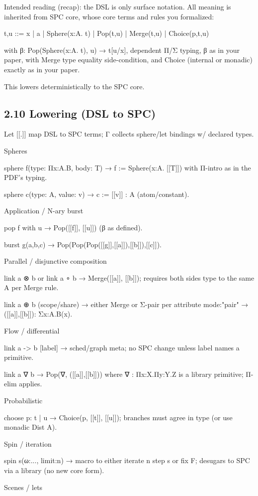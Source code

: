 \documentclass[12pt,a4paper]{article}
\theoremstyle{definition}
\theoremstyle{plain}
\begin{document}
Intended reading (recap): the DSL is only surface notation. All meaning is inherited from SPC core, whose core terms and rules you formalized:

t,u ::= x | a | Sphere(x:A. t) | Pop(t,u) | Merge(t,u) | Choice(p,t,u)

with β: Pop(Sphere(x:A. t), u) → t[u/x], dependent Π/Σ typing, β as in your paper, with Merge type equality side-condition, and Choice (internal or monadic) exactly as in your paper.

This lowers deterministically to the SPC core.

\subsection*{2.10 Lowering (DSL to SPC)}
Let [[.]] map DSL to SPC terms; Γ collects sphere/let bindings w/ declared types.

Spheres

sphere f(type: Πx:A.B, body: T) → f := Sphere(x:A. [[T]]) with Π-intro as in the PDF's typing. 

sphere c(type: A, value: v) → c := [[v]] : A (atom/constant). 


Application / N-ary burst

pop f with u → Pop([[f]], [[u]]) (β as defined). 

burst g(a,b,c) → Pop(Pop(Pop([[g]],[[a]]),[[b]]),[[c]]).

Parallel / disjunctive composition

link a ⊗ b or link a ∘ b → Merge([[a]], [[b]]); requires both sides type to the same A per Merge rule. 

link a ⊕ b (scope/share) → either Merge or Σ-pair per attribute mode:"pair" → ([[a]],[[b]]): Σx:A.B(x). 

Flow / differential

link a -> b [label] → sched/graph meta; no SPC change unless label names a primitive.

link a ∇ b → Pop(∇, ([[a]],[[b]])) where ∇ : Πx:X.Πy:Y.Z is a library primitive; Π-elim applies. 


Probabilistic

choose p: t | u → Choice(p, [[t]], [[u]]); branches must agree in type (or use monadic Dist A). 


Spin / iteration

spin s(ω:..., limit:n) → macro to either iterate n step s or fix F; desugars to SPC via a library (no new core form).


Scenes / lets
\end{document}
